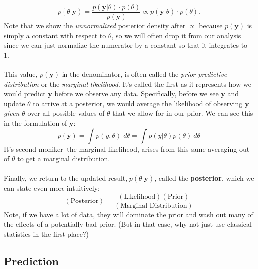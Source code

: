 \documentclass[a4paper,12pt]{scrartcl}
\begin{document}
\begin{equation}
   \label{bayes}
    p(\theta | \mathbf{y}) = \frac{p(\mathbf{y} | \theta) \cdot
      p(\theta)}{p(\mathbf{y})} \propto
      p(\mathbf{y} | \theta) \cdot p(\theta).
\end{equation}
Note that we show the \emph{unnormalized} posterior density after
$\propto$ because $p(\mathbf{y})$ is simply a constant with respect
to $\theta$, so we will often drop it from our analysis
since we can just normalize the numerator by a constant so 
that it integrates to 1.
\\
\\
This value, $p(\mathbf{y})$ in the denominator, is often called 
the \emph{prior predictive distribution} or the \emph{marginal
likelihood}.  It's called the first
as it represents how we would predict $\mathbf{y}$ 
before we observe any data. Specifically, before we see 
$\mathbf{y}$ and update $\theta$ to arrive at a posterior,
we would average the likelihood of observing 
$\mathbf{y}$ \emph{given} $\theta$ over all
possible values of $\theta$ that we allow for in our prior.
We can see this in the formulation of $\mathbf{y}$:
\begin{equation}
    \label{marglik}
    p(\mathbf{y}) = \int p(y, \theta) \; d\theta = 
	\int p(y | \theta) p(\theta) \; d\theta
\end{equation}
It's second moniker,
the marginal likelihood, arises from this same averaging out
of $\theta$ to get a marginal distribution.
\\
\\
Finally, 
we return to the updated result, $p(\theta | \mathbf{y})$,
called the \textbf{posterior}, which we can state  even more
intuitively:
   \[ (\text{Posterior}) = 
      \frac{(\text{Likelihood})(\text{Prior})}{(\text{Marginal 
      Distribution})} \]
Note, if we have a lot of data, they will dominate the prior and
wash out many of the effects of a potentially bad prior. (But in 
that case, why not just use classical statistics in the first place?)

\subsection{Prediction}
\end{document}
